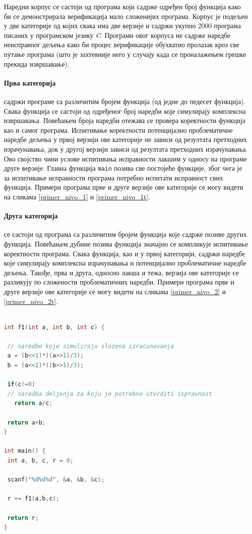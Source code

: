 \documentclass[12pt,oneside]{memoir}
\begin{document}
Наредни корпус се састоји од програма који садрже одређен број функција како би се демонстрирала верификација мало сложенијих програма. Корпус је подељен у две категорије од којих свака има две верзије и садржи укупно 2000 програма писаних у програмском језику \textit{C}. Програми овог корпуса не садрже наредбе неисправног дељења како би процес верификације обухватио пролазак кроз све путање програма (што је захтевније него у случају када се проналажењем грешке прекида извршавање).

\paragraph{Прва категорија} садржи програме са различитим бројем функција (од једне до педесет функција). Свака функција се састоји од одређеног број наредби које симулирају комплексна извршавања. Повећањем броја наредби отежава се провера коректности функција као и самог програма. Испитивање коректности потенцијално проблематичне наредбе дељења у првој верзији ове категорије не зависи од резултата претходних израчунавања, док у другој верзији зависи од резултата претходних израчунавања. Ово својство чини услове испитивања исправности лакшим у односу на програме друге верзије. Главна функција \texttt{main} позива све постојеће функције, због чега је за испитивање исправности програма потребно испитати исправност свих функција. Примери програма прве и друге верзије ове категорије се могу видети на сликама \ref{primer_nivo_1} и \ref{primer_nivo_1t}.

\paragraph{Друга категорија} се састоји од програма са различитим бројем функција које садрже позиве других функција. Повећањем дубине позива функција значајно се компликује испитивање коректности програма. Свака функција, као и у првој категорији, садржи наредбе које симулирају комплексна израчунавања и потенцијално проблематичне наредбе дељења. Такође, прва и друга, односно лакша и тежа, верзија ове категорије се разликују по сложености проблематичних наредби. Примери програма прве и друге верзије ове категорије се могу видети на сликама \ref{primer_nivo_2} и \ref{primer_nivo_2t}.
 
\begin{lstlisting}[basicstyle=\fontsize{12}{4}\selectfont,language=C,frame=single,caption=Пример програма прве категорије (прва верзија),label=primer_nivo_1]

int f1(int a, int b, int c) {

 // naredbe koje simuliraju slozena izracunavanja
 a = (b<<1)*((a>>1)/3);
 b = (a<<1)*((b>>1)/3);
  
 if(c!=0)
 // naredba deljenja za koju je potrebno utvrditi ispravnost
   return a/c;
   
 return a+b;
}

int main() {
 int a, b, c, r = 0;
 
 scanf("%d%d%d", &a, &b, &c);
 
 r += f1(a,b,c);
 
 return r;
}

\end{lstlisting}
\end{document}
